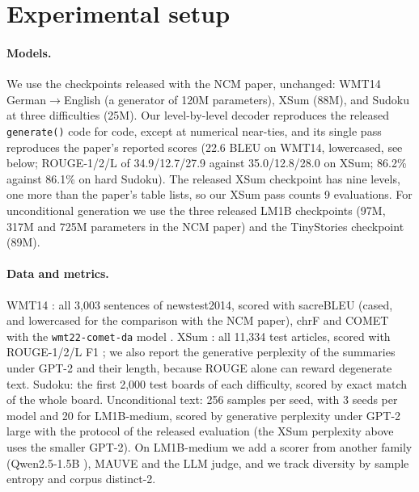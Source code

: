 \documentclass[11pt]{article}
\begin{document}
\section{Experimental setup}
\label{sec:setup}

\paragraph{Models.} We use the checkpoints released with the NCM paper, unchanged: WMT14 German$\to$English (a
generator of 120M parameters), XSum (88M), and Sudoku at three difficulties (25M). Our level-by-level decoder reproduces the released \texttt{generate()} code for code,
except at numerical near-ties, and its single pass reproduces the paper's reported scores (22.6 BLEU on WMT14, lowercased, see below;
ROUGE-1/2/L of 34.9/12.7/27.9 against 35.0/12.8/28.0 on XSum; 86.2\% against 86.1\% on hard Sudoku). The released
XSum checkpoint has nine levels, one more than the paper's table lists, so our XSum pass counts 9 evaluations. For
unconditional generation we use the three released LM1B checkpoints (97M, 317M and 725M parameters in the NCM paper)
and the TinyStories checkpoint (89M).

\paragraph{Data and metrics.} WMT14 \citep{bojar2014wmt}: all 3,003 sentences of newstest2014, scored with sacreBLEU
\citep{papineni2002bleu,post2018sacrebleu} (cased, and lowercased for the comparison with the NCM paper), chrF
\citep{popovic2015chrf} and COMET \citep{rei2020comet} with the \texttt{wmt22-comet-da} model \citep{rei2022comet22}.
XSum \citep{narayan2018xsum}: all 11,334 test articles, scored with ROUGE-1/2/L F1 \citep{lin2004rouge}; we also report
the generative perplexity of the summaries under GPT-2 \citep{radford2019gpt2} and their length, because ROUGE
alone can reward degenerate text. Sudoku: the first 2,000 test boards of each difficulty, scored by exact match of the
whole board. Unconditional text: 256 samples per seed, with 3 seeds per model and 20 for LM1B-medium, scored by
generative perplexity under GPT-2 large with the protocol of the released evaluation (the XSum perplexity above uses
the smaller GPT-2). On LM1B-medium we add a scorer from another family (Qwen2.5-1.5B \citep{qwen25}), MAUVE
\citep{pillutla2021mauve} and the LLM judge, and we track diversity by sample entropy and corpus distinct-2.
\end{document}
